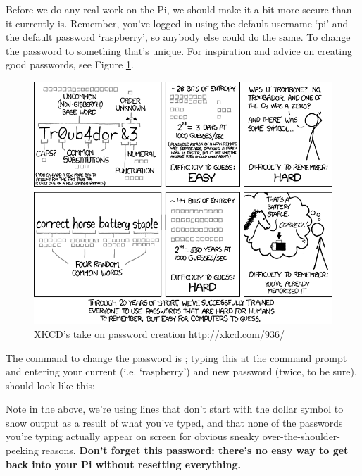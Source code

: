 Before we do any real work on the Pi, we should make it a bit more secure than it currently is. Remember, you've logged in using the default username `pi' and the default password `raspberry', so anybody else could do the same. To change the password to something that's unique. For inspiration and advice on creating good passwords, see Figure \ref{figure:xkcd-password}.

\begin{figure}
\centerline{\includegraphics[width=13.5cm]{images/xkcd-password-strength}}
\caption{XKCD's take on password creation \url{http://xkcd.com/936/}}\label{figure:xkcd-password}
\end{figure}

The command to change the password is ; typing this at the command prompt and entering your current (i.e. `raspberry') and new password (twice, to be sure), should look like this:


\noindent Note in the above, we're using lines that don't start with the dollar symbol to show output as a result of what you've typed, and that none of the passwords you're typing actually appear on screen for obvious sneaky over-the-shoulder-peeking reasons. \textbf{Don't forget this password: there's no easy way to get back into your Pi without resetting everything.}

